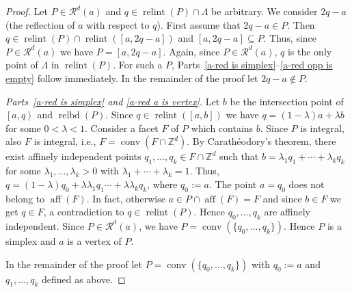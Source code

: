 \documentclass[a4paper]{article}
\theoremstyle{plain}
\begin{document}
\begin{proof}
Let $P \in {\mathcal{R}}^d(a)$ and $q \in {{\mathop{\mathrm{{relint}}}}}(P) \cap \Lambda$
be arbitrary.
We consider $2 q -a$ (the reflection of $a$ with respect to
$q$).
First assume that $2q - a \in P$.
Then $q \in {{\mathop{\mathrm{{relint}}}}}(P) \cap {{\mathop{\mathrm{{relint}}}}}([a,2q-a])$ and
$[a,2q-a] \subseteq P$.
Thus, since $P \in {\mathcal{R}}^d(a)$ we have $P=[a,2q-a]$.
Again, since $P \in {\mathcal{R}}^d(a)$, $q$ is the only point of
$\Lambda$ in ${{\mathop{\mathrm{{relint}}}}}(P)$.
For such a $P$,
Parts~\ref{a-red is simplex}--\ref{a-red opp is empty}
follow immediately.
In the remainder of the proof let $2q- a \not \in P$.

\emph{Parts~\ref{a-red is simplex} and \ref{a-red a is
    vertex}.}
Let $b$ be the intersection point of ${\left[{a,q}\right>}$ and
${{\mathop{\mathrm{{relbd}}}}}(P)$.
Since $q \in {{\mathop{\mathrm{{relint}}}}}([a,b])$ we have $q=(1-\lambda) a +
\lambda b$ for some $0 < \lambda < 1$.
Consider a facet $F$ of $P$ which contains $b$.
Since $P$ is integral, also $F$ is integral, i.e.,
$F = {{\mathop{\mathrm{{conv}}}}} (F \cap {\mathbb{Z}}^d)$.
By Carath\'eodory's theorem, there exist affinely
independent points $q_1, \ldots, q_k \in F \cap {\mathbb{Z}}^d$
such that $b = \lambda_1 q_1 + \cdots + \lambda_k q_k$ for
some $\lambda_1,\ldots,\lambda_k > 0$ with $\lambda_1 +
\cdots + \lambda_k = 1$.
Thus, $q = (1-\lambda) q_0 + \lambda \lambda_1 q_1 \cdots +
\lambda \lambda_k q_k$, where $q_0 := a$.
The point $a = q_0$ does not belong to ${{\mathop{\mathrm{{aff}}}}}(F)$.
In fact, otherwise $a \in P \cap {{\mathop{\mathrm{{aff}}}}}(F) = F$ and since $b
\in F$ we get $q \in F$, a contradiction to $q \in
{{\mathop{\mathrm{{relint}}}}}(P)$.
Hence $q_0,\ldots,q_k$ are affinely independent.
Since $P \in {\mathcal{R}}^d(a)$, we have
$P = {{\mathop{\mathrm{{conv}}}}}(\{q_0,\ldots,q_k\})$.
Hence $P$ is a simplex and $a$ is a vertex of $P$.

In the remainder of the proof let $P = {{\mathop{\mathrm{{conv}}}}}(\{q_0, \ldots,
q_k\})$ with $q_0 := a$ and $q_1, \ldots, q_k$ defined as
above.


\end{proof}
\end{document}
